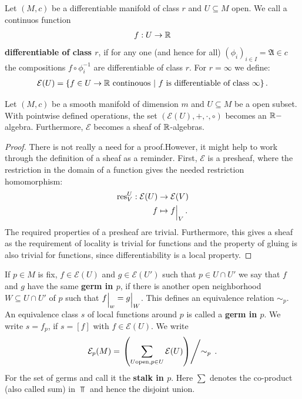\begin{definition}
    Let $(M,c)$ be a differentiable manifold of class $r$ and $U\subseteq M$ open. We call a continuos function 
    \begin{align*}
        f:U \to \mathbb{R}
    \end{align*} \textbf{differentiable of class $r$}, if for any one (and hence for all) $(\phi_i)_{i\in I}=\mathfrak{A}\in c$ the compositions $f\circ \phi_i^{-1}$ are differentiable of class $r$. For $r=\infty$ we define:
    \begin{align*}
        \mathcal{E}(U)=\{f\in U \to \mathbb{R} \text{ continouos}~|~ f \text{ is differentiable of class }\infty \} \, . 
    \end{align*}
\end{definition}
\begin{corollary}
    Let $(M,c)$ be a smooth manifold of dimension $m$ and $U\subseteq M$ be a open subset. With pointwise defined operations, the set $(\mathcal{E}(U),+,\cdot,\circ)$ becomes an $\mathbb{R}-$algebra. Furthermore, $\mathcal{E}$ becomes a sheaf of $\mathbb{R}$-algebras.
\end{corollary}
\begin{proof}
    There is not really a need for a proof.However, it might help to work through the definition of a sheaf as a reminder. First, $\mathcal{E}$ is a presheaf, where the restriction in the domain of a function gives the needed restriction homomorphism:
    \begin{align*}
        \text{res}^U_V: \mathcal{E}(U) &\to \mathcal{E}(V) \\
                                     f &\mapsto {f}\einsch{V} \, .
    \end{align*} The required properties of a presheaf are trivial. Furthermore, this gives a sheaf as the requirement of locality is trivial for functions and the property of gluing is also trivial for functions, since differentiability is a local property.
\end{proof}
\begin{definition}
    If $p\in M$ is fix, $f\in \mathcal{E}(U)$ and $g\in \mathcal{E}(U')$ such that $p\in U\cap U'$ we say that $f$ and $g$ have the same \textbf{germ in $p$}, if there is another open neighborhood $W\subseteq U\cap U'$ of $p$ such that ${f}\einsch{w}={g}\einsch{W}$. This defines an equivalence relation $\sim_p$. An equivalence class $s$ of local functions around $p$ is called a \textbf{germ in $p$}. We write $s=f_p$, if $s=[f]$ with $f\in \mathcal{E}(U)$. 
    We write 
    \begin{align*}
        \mathcal{E}_p(M)=\left. \left( \sum_{U \text{open},p\in U }\mathcal{E}(U)\right)\middle/ \sim_p \right. \, .
    \end{align*} For the set of germs and call it the \textbf{stalk in $p$}. Here $\sum$ denotes the co-product (also called sum)  in $\Top$ and hence the disjoint union.
\end{definition}
